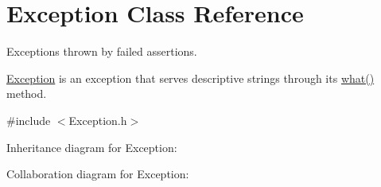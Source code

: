 \hypertarget{class_exception}{\section{Exception Class Reference}
\label{class_exception}
}


Exceptions thrown by failed assertions.

\hyperlink{class_exception}{Exception} is an exception that serves descriptive strings through its \hyperlink{class_exception_a380f0477d9ef319911e7a8167bd47f1f}{what()} method.  




{\ttfamily \#include $<$Exception.\+h$>$}



Inheritance diagram for Exception\+:


Collaboration diagram for Exception\+:
